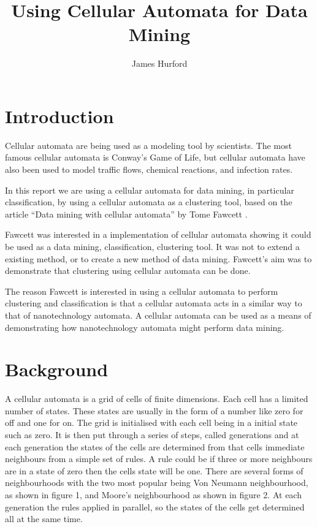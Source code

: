 \documentclass[11pt]{article}
\title{Using Cellular Automata for Data Mining}
\author{James Hurford}
\date{}
\begin{document}
\maketitle

\setcounter{tocdepth}{3}
\tableofcontents
\vspace*{1cm}



\setlength{\parindent}{0pt}
\setlength{\parskip}{1em}


\section{Introduction}
\label{sec-1}


  Cellular automata are being used as a modeling tool by
  scientists. The most famous cellular automata is Conway's Game of
  Life, but cellular automata have also been used to model traffic
  flows, chemical reactions, and infection rates.

  In this report we are using a cellular automata for data mining, in
  particular classification, by using a cellular automata as a
  clustering tool, based on the article ``Data mining with cellular
  automata'' by Tome Fawcett \cite{fawcett08}.

  Fawcett \cite{fawcett08} was interested in a implementation of
  cellular automata showing it could be used as a data mining,
  classification, clustering tool.  It was not to extend a existing
  method, or to create a new method of data mining. Fawcett's
  \cite{fawcett08} aim was to demonstrate that clustering using
  cellular automata can be done.

  The reason Fawcett \cite{fawcett08} is interested in using a
  cellular automata to perform clustering and classification is that a
  cellular automata acts in a similar way to that of nanotechnology
  automata. A cellular automata can be used as a means of
  demonstrating how nanotechnology automata might perform data mining.
\section{Background}
\label{sec-2}

  A cellular automata is a grid of cells of finite dimensions.  Each
  cell has a limited number of states.  These states are usually in
  the form of a number like zero for off and one for on.  The grid is
  initialised with each cell being in a initial state such as zero.
  It is then put through a series of steps, called generations and at
  each generation the states of the cells are determined from that
  cells immediate neighbours from a simple set of rules.  A rule could
  be if three or more neighbours are in a state of zero then the cells
  state will be one.  There are several forms of neighbourhoods with
  the two most popular being Von Neumann neighbourhood, as shown in
  figure 1, and Moore's neighbourhood as shown in figure 2. At each
  generation the rules applied in parallel, so the states of the cells
  get determined all at the same time.
\end{document}
